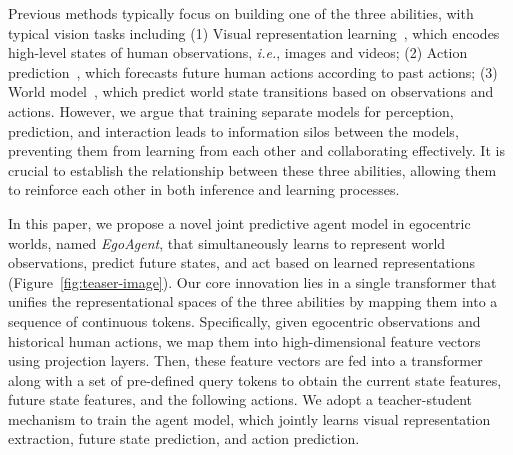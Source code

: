 Previous methods typically focus on building one of the three abilities, with typical vision tasks including (1) Visual representation learning~\cite{caron2021emerging,he2022masked, chen2020simple, khosla2020supervised,wang2022revisiting}, which encodes high-level states of human observations, \emph{i.e.}, images and videos; (2) Action prediction~\cite{martinez2017human,cao2020long}, which forecasts future human actions according to past actions; (3) World model~\cite{mendonca2023structured,yang2023learning}, which predict world state transitions based on observations and actions.
However, we argue that training separate models for perception, prediction, and interaction leads to information silos between the models, preventing them from learning from each other and collaborating effectively.
It is crucial to establish the relationship between these three abilities, allowing them to reinforce each other in both inference and learning processes.


In this paper, we propose a novel joint predictive agent model in egocentric worlds, named \emph{EgoAgent}, that simultaneously learns to represent world observations, predict future states, and act based on learned representations (Figure~\ref{fig:teaser-image}).
Our core innovation lies in a single transformer that unifies the representational spaces of the three abilities by mapping them into a sequence of continuous tokens.
Specifically, given egocentric observations and historical human actions, we map them into high-dimensional feature vectors using projection layers. 
Then, these feature vectors are fed into a transformer along with a set of pre-defined query tokens to obtain the current state features, future state features, and the following actions.
We adopt a teacher-student mechanism to train the agent model, which jointly learns visual representation extraction, future state prediction, and action prediction.


